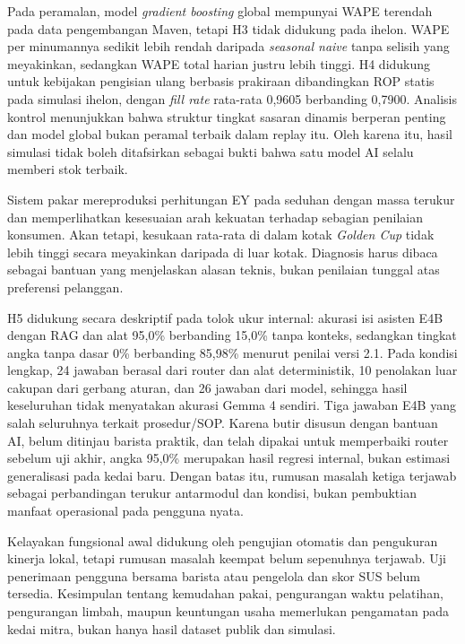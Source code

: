 Pada peramalan, model \textit{gradient boosting} global mempunyai WAPE terendah pada data pengembangan Maven, tetapi H3 tidak didukung pada ihelon. WAPE per minumannya sedikit lebih rendah daripada \textit{seasonal naive} tanpa selisih yang meyakinkan, sedangkan WAPE total harian justru lebih tinggi. H4 didukung untuk kebijakan pengisian ulang berbasis prakiraan dibandingkan ROP statis pada simulasi ihelon, dengan \textit{fill rate} rata-rata 0,9605 berbanding 0,7900. Analisis kontrol menunjukkan bahwa struktur tingkat sasaran dinamis berperan penting dan model global bukan peramal terbaik dalam replay itu. Oleh karena itu, hasil simulasi tidak boleh ditafsirkan sebagai bukti bahwa satu model AI selalu memberi stok terbaik.

Sistem pakar mereproduksi perhitungan EY pada seduhan dengan massa terukur dan memperlihatkan kesesuaian arah kekuatan terhadap sebagian penilaian konsumen. Akan tetapi, kesukaan rata-rata di dalam kotak \textit{Golden Cup} tidak lebih tinggi secara meyakinkan daripada di luar kotak. Diagnosis harus dibaca sebagai bantuan yang menjelaskan alasan teknis, bukan penilaian tunggal atas preferensi pelanggan.

H5 didukung secara deskriptif pada tolok ukur internal: akurasi isi asisten E4B dengan RAG dan alat 95,0\% berbanding 15,0\% tanpa konteks, sedangkan tingkat angka tanpa dasar 0\% berbanding 85,98\% menurut penilai versi 2.1. Pada kondisi lengkap, 24 jawaban berasal dari router dan alat deterministik, 10 penolakan luar cakupan dari gerbang aturan, dan 26 jawaban dari model, sehingga hasil keseluruhan tidak menyatakan akurasi Gemma 4 sendiri. Tiga jawaban E4B yang salah seluruhnya terkait prosedur/SOP. Karena butir disusun dengan bantuan AI, belum ditinjau barista praktik, dan telah dipakai untuk memperbaiki router sebelum uji akhir, angka 95,0\% merupakan hasil regresi internal, bukan estimasi generalisasi pada kedai baru. Dengan batas itu, rumusan masalah ketiga terjawab sebagai perbandingan terukur antarmodul dan kondisi, bukan pembuktian manfaat operasional pada pengguna nyata.

Kelayakan fungsional awal didukung oleh pengujian otomatis dan pengukuran kinerja lokal, tetapi rumusan masalah keempat belum sepenuhnya terjawab. Uji penerimaan pengguna bersama barista atau pengelola dan skor SUS belum tersedia. Kesimpulan tentang kemudahan pakai, pengurangan waktu pelatihan, pengurangan limbah, maupun keuntungan usaha memerlukan pengamatan pada kedai mitra, bukan hanya hasil dataset publik dan simulasi.

